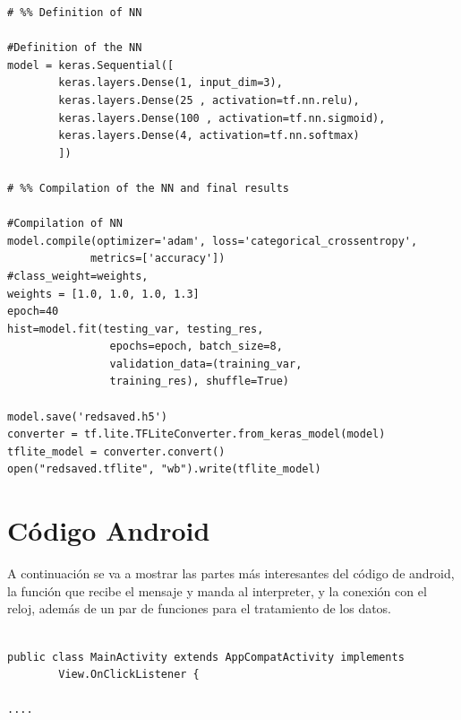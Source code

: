 \documentclass[12pt]{book}
\numberwithin{equation}{section}
\begin{document}
\begin{appendices}
\begin{verbatim}
# %% Definition of NN

#Definition of the NN
model = keras.Sequential([
		keras.layers.Dense(1, input_dim=3),
		keras.layers.Dense(25 , activation=tf.nn.relu),
		keras.layers.Dense(100 , activation=tf.nn.sigmoid),
		keras.layers.Dense(4, activation=tf.nn.softmax)
		])

# %% Compilation of the NN and final results

#Compilation of NN
model.compile(optimizer='adam', loss='categorical_crossentropy',
			 metrics=['accuracy'])
#class_weight=weights,
weights = [1.0, 1.0, 1.0, 1.3]
epoch=40
hist=model.fit(testing_var, testing_res,
				epochs=epoch, batch_size=8, 
				validation_data=(training_var, 
				training_res), shuffle=True)

model.save('redsaved.h5')
converter = tf.lite.TFLiteConverter.from_keras_model(model)
tflite_model = converter.convert()
open("redsaved.tflite", "wb").write(tflite_model)

\end{verbatim}

\section{Código Android}

A continuación se va a mostrar las partes más interesantes del código de android, la función que recibe el mensaje y manda al interpreter, y la conexión con el reloj, además de un par de funciones para el tratamiento de los datos.
\begin{verbatim}

public class MainActivity extends AppCompatActivity implements
        View.OnClickListener {

....


\end{verbatim}
\end{appendices}
\end{document}
